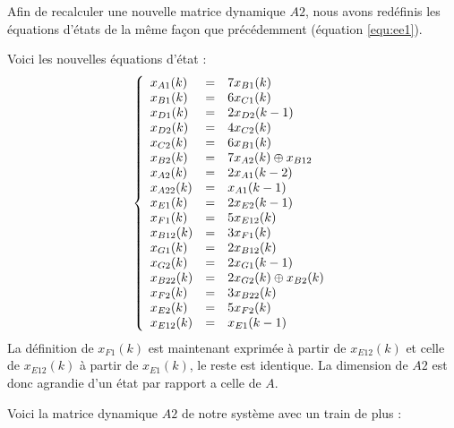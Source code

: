 Afin de recalculer une nouvelle matrice dynamique $A2$, nous avons redéfinis les équations d'états de la même façon que précédemment (équation \ref{equ:ee1}). 

Voici les nouvelles équations d'état :
\begin{equation}
\label{equ:ee1}
\left\lbrace
\begin{array}{l c l}
x_{A1}(k) &=&	7x_{B1}(k)\\ 
x_{B1}(k) &=&	6x_{C1}(k)\\
x_{D1}(k) &=&	2x_{D2}(k-1)\\
x_{D2}(k) &=&	4x_{C2}(k)\\
x_{C2}(k) &=&	6x_{B1}(k)\\
x_{B2}(k) &=&	7x_{A2}(k) \oplus x_{B12}\\
x_{A2}(k) &=&	2x_{A1}(k-2)\\
x_{A22}(k) &=&	x_{A1}(k-1)\\
x_{E1}(k) &=&	2x_{E2}(k-1)\\
x_{F1}(k) &=&	5x_{E12}(k)\\
x_{B12}(k) &=&	3x_{F1}(k)\\
x_{G1}(k) &=&	2x_{B12}(k)\\
x_{G2}(k) &=&	2x_{G1}(k-1)\\
x_{B22}(k) &=&	2x_{G2}(k) \oplus x_{B2}(k)\\
x_{F2}(k) &=&	3x_{B22}(k)\\
x_{E2}(k) &=&	5x_{F2}(k)   \\  
x_{E12}(k) &=&	x_{E1}(k-1)   \\  
\end{array}
\right.
\end{equation}
La définition de $x_{F1}(k)$ est maintenant exprimée à partir de $x_{E12}(k)$ et celle de $x_{E12}(k)$ à partir de $x_{E1}(k)$, le reste est identique.
La dimension de $A2$ est donc agrandie d'un état par rapport a celle de $A$.


Voici la matrice dynamique $A2$ de notre système avec un train de plus :




